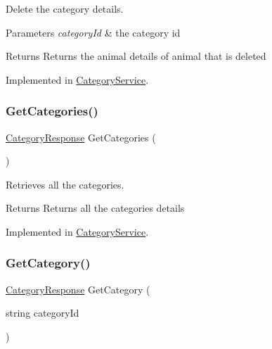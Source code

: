 Delete the category details. 
\begin{DoxyParams}{Parameters}
{\em category\+Id} & the category id\\
\hline
\end{DoxyParams}
\begin{DoxyReturn}{Returns}
Returns the animal details of animal that is deleted
\end{DoxyReturn}




Implemented in \hyperlink{classWildLifeTracker_1_1CategoryService_a6479e2a6945b14d40e8c57642e9d2665}{Category\+Service}.

\mbox{\label{interfaceWildLifeTracker_1_1ICategoryService_af5ed969c812807a721f06819c9b22356}} 
\subsubsection{\texorpdfstring{Get\+Categories()}{GetCategories()}}
{\footnotesize\ttfamily \hyperlink{classWildLifeTracker_1_1Response_1_1CategoryResponse}{Category\+Response} Get\+Categories (\begin{DoxyParamCaption}{ }\end{DoxyParamCaption})}



Retrieves all the categories. \begin{DoxyReturn}{Returns}
Returns all the categories details
\end{DoxyReturn}




Implemented in \hyperlink{classWildLifeTracker_1_1CategoryService_af5ed969c812807a721f06819c9b22356}{Category\+Service}.

\mbox{\label{interfaceWildLifeTracker_1_1ICategoryService_ac989af6747cc8b28f508ef7a4645d22f}} 
\subsubsection{\texorpdfstring{Get\+Category()}{GetCategory()}}
{\footnotesize\ttfamily \hyperlink{classWildLifeTracker_1_1Response_1_1CategoryResponse}{Category\+Response} Get\+Category (\begin{DoxyParamCaption}\item[{string}]{category\+Id }\end{DoxyParamCaption})}



